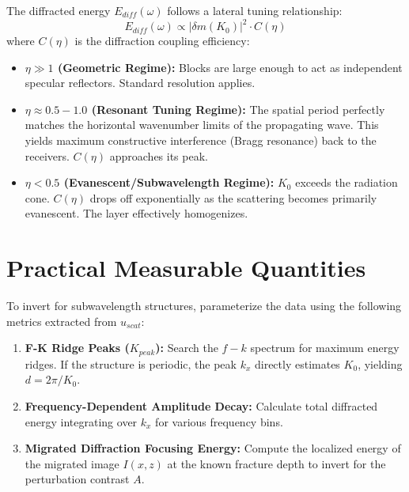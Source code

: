 \documentclass{article}
\begin{document}
The diffracted energy $E_{diff}(\omega)$ follows a lateral tuning relationship:
\begin{equation}
E_{diff}(\omega) \propto |\delta m(K_0)|^2 \cdot C(\eta)
\end{equation}
where $C(\eta)$ is the diffraction coupling efficiency:
\begin{itemize}
    \item \textbf{$\eta \gg 1$ (Geometric Regime):} Blocks are large enough to act as independent specular reflectors. Standard resolution applies.
    \item \textbf{$\eta \approx 0.5 - 1.0$ (Resonant Tuning Regime):} The spatial period perfectly matches the horizontal wavenumber limits of the propagating wave. This yields maximum constructive interference (Bragg resonance) back to the receivers. $C(\eta)$ approaches its peak.
    \item \textbf{$\eta < 0.5$ (Evanescent/Subwavelength Regime):} $K_0$ exceeds the radiation cone. $C(\eta)$ drops off exponentially as the scattering becomes primarily evanescent. The layer effectively homogenizes.
\end{itemize}

\section{Practical Measurable Quantities}
To invert for subwavelength structures, parameterize the data using the following metrics extracted from $u_{scat}$:
\begin{enumerate}
    \item \textbf{F-K Ridge Peaks ($K_{peak}$):} Search the $f-k$ spectrum for maximum energy ridges. If the structure is periodic, the peak $k_x$ directly estimates $K_0$, yielding $d = 2\pi/K_0$.
    \item \textbf{Frequency-Dependent Amplitude Decay:} Calculate total diffracted energy integrating over $k_x$ for various frequency bins.
    \item \textbf{Migrated Diffraction Focusing Energy:} Compute the localized energy of the migrated image $I(x,z)$ at the known fracture depth to invert for the perturbation contrast $A$.
\end{enumerate}
\end{document}
